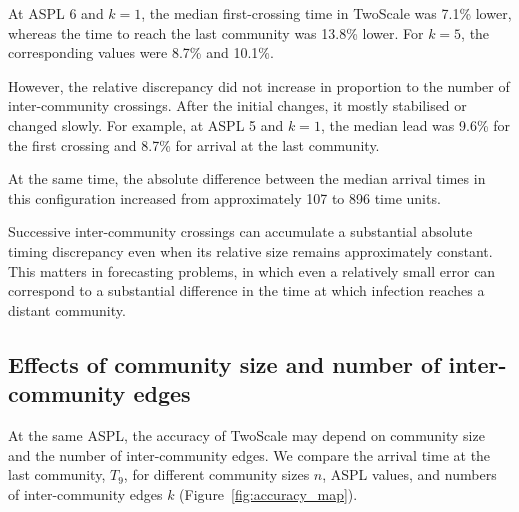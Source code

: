 \documentclass{ieeeaccess}
\newcommand{\TS}{\textup{TwoScale}}
\begin{document}
At ASPL 6 and $k=1$, the median first-crossing time in \TS{} was 7.1\% lower, whereas the time to reach the last community was 13.8\% lower. For $k=5$, the corresponding values were 8.7\% and 10.1\%.

However, the relative discrepancy did not increase in proportion to the number of inter-community crossings. After the initial changes, it mostly stabilised or changed slowly. For example, at ASPL 5 and $k=1$, the median lead was 9.6\% for the first crossing and 8.7\% for arrival at the last community.

At the same time, the absolute difference between the median arrival times in this configuration increased from approximately 107 to 896 time units.

Successive inter-community crossings can accumulate a substantial absolute timing discrepancy even when its relative size remains approximately constant. This matters in forecasting problems, in which even a relatively small error can correspond to a substantial difference in the time at which infection reaches a distant community.

\subsection{Effects of community size and number of inter-community edges}
\label{sec:res_size}

At the same ASPL, the accuracy of \TS{} may depend on community size and the number of inter-community edges. We compare the arrival time at the last community, $T_9$, for different community sizes $n$, ASPL values, and numbers of inter-community edges $k$ (Figure~\ref{fig:accuracy_map}).
\end{document}
